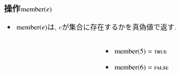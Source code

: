 \documentclass[main]{subfiles}
\begin{document}
\begin{frame}\frametitle{操作$\mathrm{member}(e)$}
\begin{itemize}
\item $\mathrm{member}(e)$は, $e$が集合に存在するかを真偽値で返す.\\
\end{itemize}
\begin{columns}[c]
	\begin{column}{0.5\linewidth}
		
	\end{column}
	\begin{column}{0.49\linewidth}
		\begin{itemize}
			\item $\mathrm{member}(5) = \text{\textsc{true}}$\\
			\item $\mathrm{member}(6) = \text{\textsc{false}}$\\
		\end{itemize}
	\end{column}
\end{columns}
\end{frame}
\end{document}
